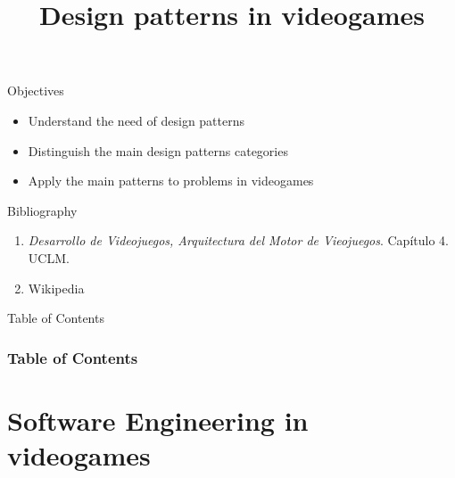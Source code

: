 \documentclass[10pt,compress]{beamer} %
\title[Design patterns in videogames]{Design patterns in videogames}
\author{}
\institute{\asignatura}
\date{}
\begin{document}
{\titlepageBlue
    \begin{frame}
        \titlepage
    \end{frame}
}

\begin{frame}[plain]{}
   \begin{block}{Objectives}
   \begin{itemize}
        \item Understand the need of design patterns
		\item Distinguish the main design patterns categories
		\item Apply the main patterns to problems in videogames
	\end{itemize}
	\end{block}

   \begin{block}{Bibliography}
      \begin{enumerate}
          \item  \textit{Desarrollo de Videojuegos, Arquitectura del Motor de Vieojuegos}. Capítulo 4. UCLM.
		  \item Wikipedia
      \end{enumerate} 
   \end{block}
\end{frame}

{
\begin{frame}[shrink]{Table of Contents}
 \frametitle{Table of Contents}
 \tableofcontents
\end{frame}
}

\section{Software Engineering in videogames}
\end{document}
